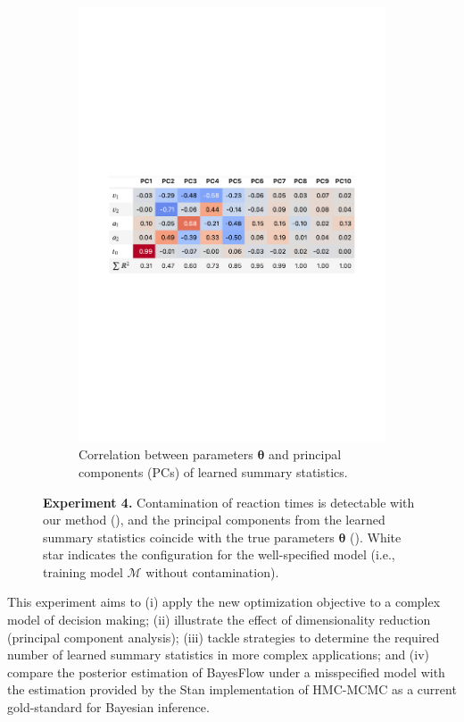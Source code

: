 \documentclass[twoside,11pt]{article}
\newcommand{\numberDDM}{4}
\newcommand{\thetab}{\boldsymbol{\theta}}
\newcommand{\0}{\boldsymbol{0}}
\newcommand{\M}{\mathcal{M}}
\renewcommand{\cite}[1]{\citep{#1}}
\begin{document}
\begin{figure}[t]
\begin{subfigure}[t]{0.62\linewidth}
        \includegraphics[width=\linewidth]{abf_ddm_unbounded_pca_table.pdf}
        \caption{Correlation between parameters $\thetab$ and principal components (PCs) of learned summary statistics.}
        \label{fig:exp:ddm-pca}
    \end{subfigure}
    \caption{\textbf{Experiment \numberDDM.} Contamination of reaction times is detectable with our method (), and the principal components from the learned summary statistics coincide with the true parameters $\thetab$ ().
    White star indicates the configuration for the well-specified model (i.e., training model $\M$ without contamination).}
    \label{fig:exp:ddm-figure}
\end{figure}
This experiment aims to (i) apply the new optimization objective to a complex model of decision making; (ii) illustrate the effect of dimensionality reduction (principal component analysis); (iii) tackle strategies to determine the required number of learned summary statistics in more complex applications; and (iv) compare the posterior estimation of BayesFlow under a misspecified model with the estimation provided by the Stan implementation of HMC-MCMC \cite{Carpenter2017, Stan2022} as a current gold-standard for Bayesian inference.
\end{document}
